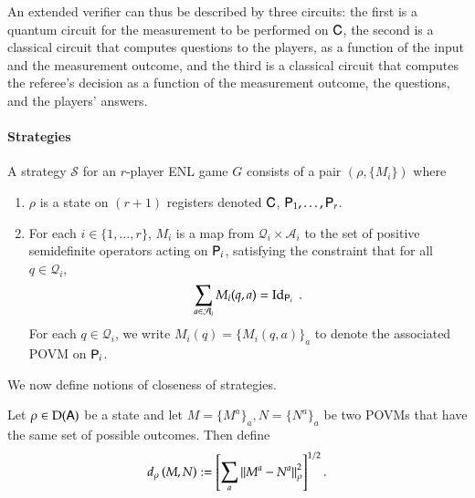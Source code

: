 An extended verifier can thus be described by three circuits: the first is a quantum circuit for the measurement to be performed on ${\mathsf{C}}$, the second is a classical circuit that computes questions to the players, as a function of the input and the measurement outcome, and the third is a classical circuit that computes the referee's decision as a function of the measurement outcome, the questions, and the players' answers. 



\paragraph{Strategies}

A strategy $\mathcal{S}$ for an $r$-player ENL game $G$ consists of a pair $(\rho,\{M_i\})$ where
\begin{enumerate}
	\item $\rho$ is a state on $(r+1)$ registers denoted ${\mathsf{C}}$, ${\mathsf{P}}_1,\ldots, {\mathsf{P}}_r$.
	\item For each $i\in\{1,\ldots,r\}$, $M_i$ is a map from $\mathcal{Q}_i \times \mathcal{A}_i$ to the set of positive semidefinite operators acting on ${\mathsf{P}}_i$, satisfying the constraint that for all $q \in \mathcal{Q}_i$,
	\[
		\sum_{a \in \mathcal{A}_i} M_i(q,a) = \mathop{\mathrm{Id}}\!\mathinner{}_{{\mathsf{P}}_i}\;.
	\]
	For each $q \in \mathcal{Q}_i$, we write $M_i(q) = \{M_i(q,a)\}_a$ to denote the associated POVM on ${\mathsf{P}}_i$.
\end{enumerate}


We now define notions of closeness of strategies. 

\begin{definition}
	Let $\rho \in \mathrm{D}({\mathsf{A}})$ be a state and let $M = \{M^a\}_a,N = \{N^a\}_a$ be two POVMs that have the same set of possible outcomes. Then define 
	\begin{align}
		d_\rho \left( M, N \right) := \left[ \sum_a \left\lVert M^a - N^a \right\rVert_\rho^2 \right]^{1/2}.
	\end{align}
\end{definition}


